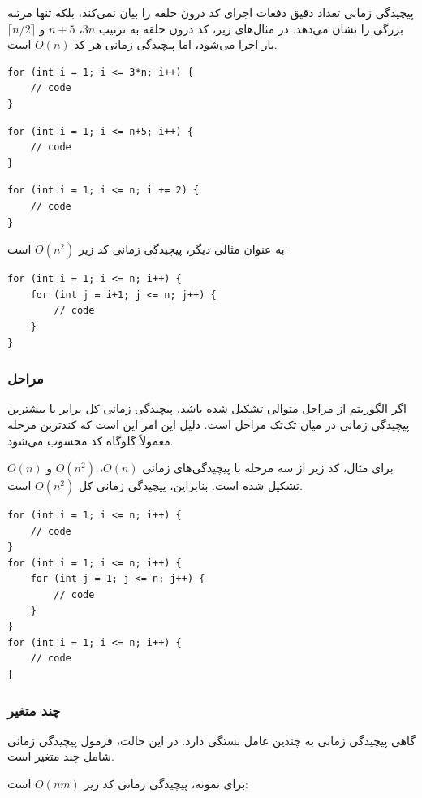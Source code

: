 پیچیدگی زمانی تعداد دقیق دفعات اجرای کد درون حلقه را بیان نمی‌کند،
بلکه تنها مرتبه بزرگی را نشان می‌دهد.
در مثال‌های زیر، کد درون حلقه به ترتیب $3n$، $n+5$ و $\lceil n/2 \rceil$ بار اجرا می‌شود،
اما پیچیدگی زمانی هر کد $O(n)$ است.

\begin{lstlisting}
for (int i = 1; i <= 3*n; i++) {
    // code
}
\end{lstlisting}

\begin{lstlisting}
for (int i = 1; i <= n+5; i++) {
    // code
}
\end{lstlisting}

\begin{lstlisting}
for (int i = 1; i <= n; i += 2) {
    // code
}
\end{lstlisting}

به عنوان مثالی دیگر،
پیچیدگی زمانی کد زیر $O(n^2)$ است:

\begin{lstlisting}
for (int i = 1; i <= n; i++) {
    for (int j = i+1; j <= n; j++) {
        // code
    }
}
\end{lstlisting}

\subsubsection*{مراحل}

اگر الگوریتم از مراحل متوالی تشکیل شده باشد،
پیچیدگی زمانی کل برابر با بیشترین پیچیدگی زمانی در میان تک‌تک مراحل است.
دلیل این امر این است که کندترین مرحله معمولاً گلوگاه کد محسوب می‌شود.

برای مثال، کد زیر از سه مرحله با پیچیدگی‌های زمانی
$O(n)$، $O(n^2)$ و $O(n)$ تشکیل شده است.
بنابراین، پیچیدگی زمانی کل $O(n^2)$ است.

\begin{lstlisting}
for (int i = 1; i <= n; i++) {
    // code
}
for (int i = 1; i <= n; i++) {
    for (int j = 1; j <= n; j++) {
        // code
    }
}
for (int i = 1; i <= n; i++) {
    // code
}
\end{lstlisting}

\subsubsection*{چند متغیر}

گاهی پیچیدگی زمانی به چندین عامل بستگی دارد.
در این حالت، فرمول پیچیدگی زمانی شامل چند متغیر است.

برای نمونه، پیچیدگی زمانی کد زیر $O(nm)$ است:

